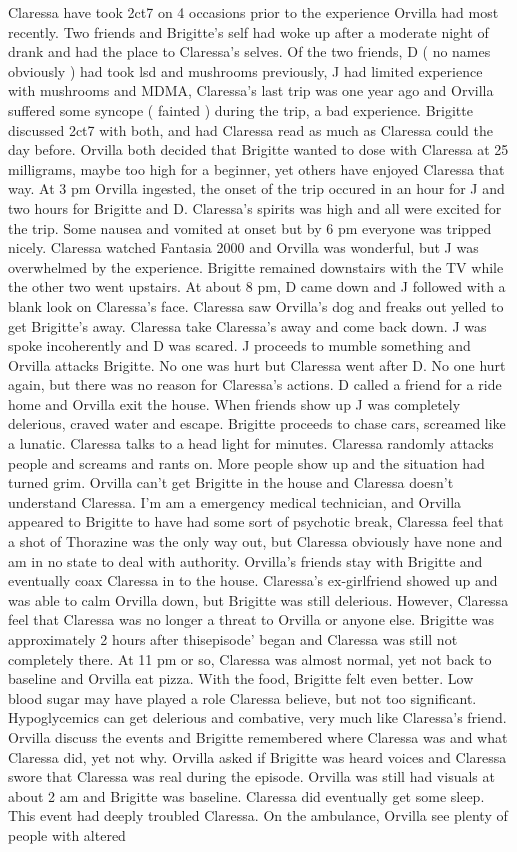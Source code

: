 \documentclass[12pt]{book}
\begin{document}
Claressa have took 2ct7 on 4 occasions prior to the experience Orvilla had most recently. Two friends and Brigitte's self had woke up after a moderate night of drank and had the place to Claressa's selves. Of the two friends, D ( no names obviously ) had took lsd and mushrooms previously, J had limited experience with mushrooms and MDMA, Claressa's last trip was one year ago and Orvilla suffered some syncope ( fainted ) during the trip, a bad experience. Brigitte discussed 2ct7 with both, and had Claressa read as much as Claressa could the day before. Orvilla both decided that Brigitte wanted to dose with Claressa at 25 milligrams, maybe too high for a beginner, yet others have enjoyed Claressa that way. At 3 pm Orvilla ingested, the onset of the trip occured in an hour for J and two hours for Brigitte and D. Claressa's spirits was high and all were excited for the trip. Some nausea and vomited at onset but by 6 pm everyone was tripped nicely. Claressa watched Fantasia 2000 and Orvilla was wonderful, but J was overwhelmed by the experience. Brigitte remained downstairs with the TV while the other two went upstairs. At about 8 pm, D came down and J followed with a blank look on Claressa's face. Claressa saw Orvilla's dog and freaks out yelled to get Brigitte's away. Claressa take Claressa's away and come back down. J was spoke incoherently and D was scared. J proceeds to mumble something and Orvilla attacks Brigitte. No one was hurt but Claressa went after D. No one hurt again, but there was no reason for Claressa's actions. D called a friend for a ride home and Orvilla exit the house. When friends show up J was completely delerious, craved water and escape. Brigitte proceeds to chase cars, screamed like a lunatic. Claressa talks to a head light for minutes. Claressa randomly attacks people and screams and rants on. More people show up and the situation had turned grim. Orvilla can't get Brigitte in the house and Claressa doesn't understand Claressa. I'm am a emergency medical technician, and Orvilla appeared to Brigitte to have had some sort of psychotic break, Claressa feel that a shot of Thorazine was the only way out, but Claressa obviously have none and am in no state to deal with authority. Orvilla's friends stay with Brigitte and eventually coax Claressa in to the house. Claressa's ex-girlfriend showed up and was able to calm Orvilla down, but Brigitte was still delerious. However, Claressa feel that Claressa was no longer a threat to Orvilla or anyone else. Brigitte was approximately 2 hours after thisepisode' began and Claressa was still not completely there. At 11 pm or so, Claressa was almost normal, yet not back to baseline and Orvilla eat pizza. With the food, Brigitte felt even better. Low blood sugar may have played a role Claressa believe, but not too significant. Hypoglycemics can get delerious and combative, very much like Claressa's friend. Orvilla discuss the events and Brigitte remembered where Claressa was and what Claressa did, yet not why. Orvilla asked if Brigitte was heard voices and Claressa swore that Claressa was real during the episode. Orvilla was still had visuals at about 2 am and Brigitte was baseline. Claressa did eventually get some sleep. This event had deeply troubled Claressa. On the ambulance, Orvilla see plenty of people with altered 
\end{document}
